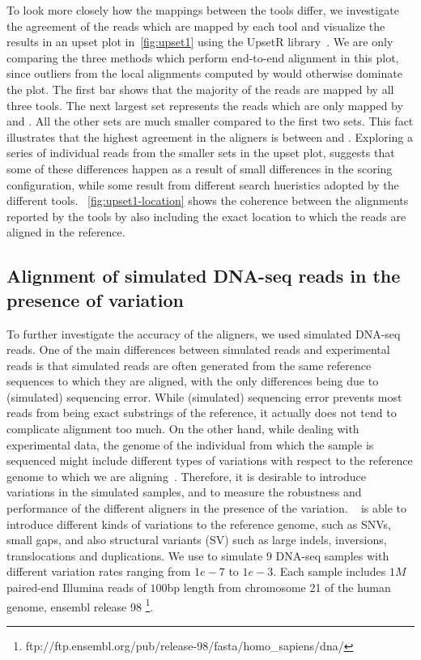 To look more closely how the mappings between the tools differ, we investigate the agreement of the reads 
which are mapped by each tool and visualize the results in an upset plot in~\cref{fig:upset1} using the 
UpsetR library~\citep{conway2017upsetr}.  We are only comparing the three methods which perform end-to-end 
alignment in this plot, since outliers from the local alignments computed by \debga would otherwise dominate 
the plot. The first bar shows that the majority of the reads are mapped by all three tools.
The next largest set represents the reads which are only mapped by \bt and \puffaligner. All the other sets 
are much smaller compared to the first two sets. This fact illustrates that the highest agreement in the 
aligners is between \bt and \puffaligner. Exploring a series of individual reads from the smaller sets in 
the upset plot, suggests that some of these differences happen as a result of small differences in the scoring 
configuration, while some result from different search hueristics adopted by the different tools.
~\cref{fig:upset1-location} shows the coherence between the alignments reported by the tools by also including 
the exact location to which the reads are aligned in the reference.



\subsection{Alignment of simulated DNA-seq reads in the presence of variation}

To further investigate the accuracy of the aligners, we used simulated DNA-seq reads. One of the main 
differences between simulated reads and experimental reads is that simulated reads are often generated 
from the same reference sequences to which they are aligned, with the only differences being due to 
(simulated) sequencing error.  While (simulated) sequencing error prevents most reads from being exact 
substrings of the reference, it actually does not tend to complicate alignment too much.
On the other hand, while dealing with experimental data, the genome of the individual from which
the sample is sequenced might include different types of variations with respect to the reference 
genome to which we are aligning~\citep{srivastava2019alignment}. Therefore, it is desirable to introduce 
variations in the simulated samples, and to measure the robustness and performance of the different 
aligners in the presence of the variation. \mason~\citep{holtgrewe2010mason} is able to introduce different 
kinds of variations to the reference genome, such as SNVs, small gaps, and also structural variants (SV) 
such as large indels, inversions, translocations and duplications. We use \mason to simulate $9$ DNA-seq 
samples with different variation rates ranging from $1e-7$ to $1e-3$. Each sample includes $1M$ paired-end 
Illumina reads of $100$bp length from chromosome 21 of the human genome, ensembl release 98
\footnote{ftp://ftp.ensembl.org/pub/release-98/fasta/homo\_sapiens/dna/}. 

